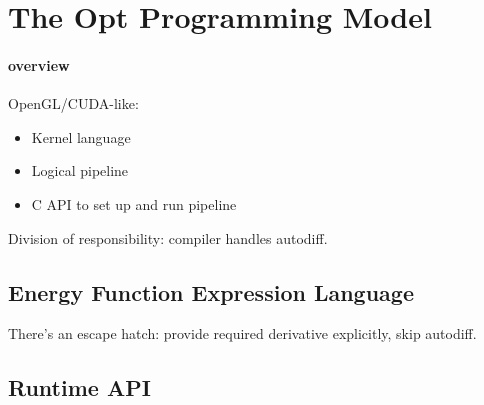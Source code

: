 \section{The Opt Programming Model}
\label{sec:language}


\paragraph{overview} 
OpenGL/CUDA-like:
\begin{itemize}
  \item Kernel language
  \item Logical pipeline
  \item C API to set up and run pipeline
\end{itemize}

Division of responsibility: compiler handles autodiff.

\subsection{Energy Function Expression Language} %
\label{sub:expression_language}


There's an escape hatch: provide required derivative explicitly, skip autodiff.


\subsection{Runtime API} %
\label{sub:runtime_api}





